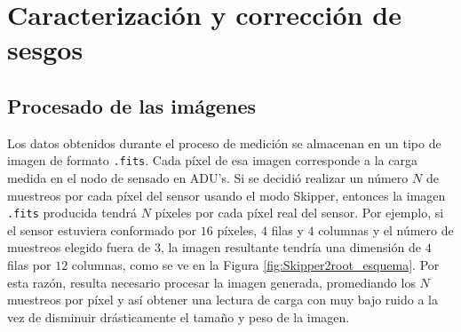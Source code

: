 \chapter{Caracterización y corrección de sesgos \label{chap:Analisis}}

\section{Procesado de las imágenes \label{sec:ProcesadoDatos}}
\noindent Los datos obtenidos durante el proceso de medición se almacenan en un tipo de imagen de formato \verb|.fits|. Cada píxel de esa imagen corresponde a la carga medida en el nodo de sensado en ADU's. Si se decidió realizar un número $N$ de muestreos por cada píxel del sensor usando el modo Skipper, entonces la imagen \verb|.fits| producida tendrá $N$ píxeles por cada píxel real del sensor. Por ejemplo, si el sensor estuviera conformado por $16$ píxeles, $4$ filas y $4$ columnas y el número de muestreos elegido fuera de $3$, la imagen resultante tendría una dimensión de $4$ filas por $12$ columnas, como se ve en la Figura \ref{fig:Skipper2root_esquema}. 
Por esta razón, resulta necesario procesar la imagen generada, promediando los $N$ muestreos por píxel y así obtener una lectura de carga con muy bajo ruido a la vez de disminuir drásticamente el tamaño y peso de la imagen.

